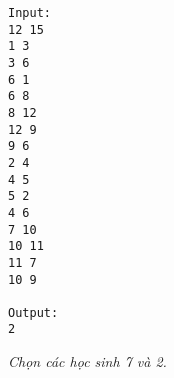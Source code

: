 \begin{verbatim}
Input:
12 15
1 3
3 6
6 1
6 8
8 12
12 9
9 6
2 4
4 5
5 2
4 6
7 10
10 11
11 7
10 9

Output:
2
\end{verbatim}

\emph{Chọn các học sinh 7 và 2. }